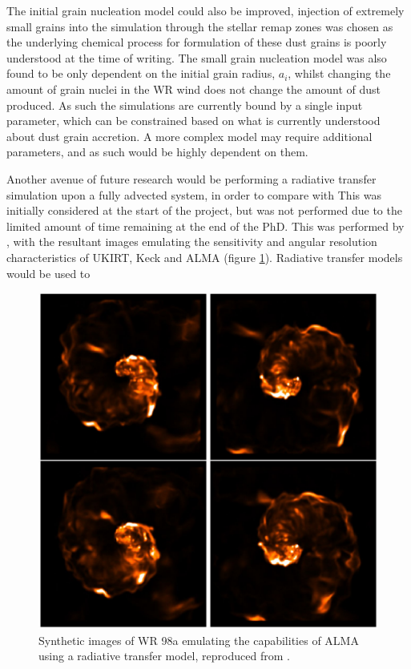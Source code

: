
The initial grain nucleation model could also be improved, injection of extremely small grains into the simulation through the stellar remap zones was chosen as the underlying chemical process for formulation of these dust grains is poorly understood at the time of writing.
The small grain nucleation model was also found to be only dependent on the initial grain radius, $a_i$, whilst changing the amount of grain nuclei in the WR wind does not change the amount of dust produced.
As such the simulations are currently bound by a single input parameter, which can be constrained based on what is currently understood about dust grain accretion.
A more complex model may require additional parameters, and as such would be highly dependent on them.


Another avenue of future research would be performing a radiative transfer simulation upon a fully advected system, in order to compare with 
This was initially considered at the start of the project, but was not performed due to the limited amount of time remaining at the end of the PhD.
This was performed by \textcite{hendrix_pinwheels_2016}, with the resultant images emulating the sensitivity and angular resolution characteristics of UKIRT, Keck and ALMA (figure \ref{fig:hendrix-synthetic}).
Radiative transfer models would be used to 

\begin{figure}
  \centering
  \includegraphics{assets/hendrix-synthetic-observation.jpeg}
  \caption[\textcite{hendrix_pinwheels_2016} synthetic astronomy]{Synthetic images of WR 98a emulating the capabilities of ALMA using a radiative transfer model, reproduced from \textcite{hendrix_pinwheels_2016}.}
  \label{fig:hendrix-synthetic}
\end{figure}